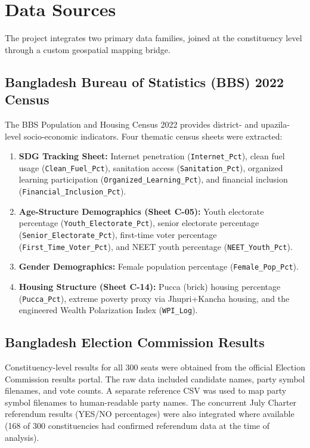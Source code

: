 \documentclass[12pt, a4paper]{article}
\begin{document}
\section{Data Sources}

The project integrates two primary data families, joined at the constituency level through a custom geospatial mapping bridge.

\subsection{Bangladesh Bureau of Statistics (BBS) 2022 Census}
The BBS Population and Housing Census 2022 provides district- and upazila-level socio-economic indicators. Four thematic census sheets were extracted:

\begin{enumerate}
    \item \textbf{SDG Tracking Sheet:} Internet penetration (\texttt{Internet\_Pct}), clean fuel usage (\texttt{Clean\_Fuel\_Pct}), sanitation access (\texttt{Sanitation\_Pct}), organized learning participation (\texttt{Organized\_Learning\_Pct}), and financial inclusion (\texttt{Financial\_Inclusion\_Pct}).
    \item \textbf{Age-Structure Demographics (Sheet C-05):} Youth electorate percentage (\texttt{Youth\_Electorate\_Pct}), senior electorate percentage (\texttt{Senior\_Electorate\_Pct}), first-time voter percentage (\texttt{First\_Time\_Voter\_Pct}), and NEET youth percentage (\texttt{NEET\_Youth\_Pct}).
    \item \textbf{Gender Demographics:} Female population percentage (\texttt{Female\_Pop\_Pct}).
    \item \textbf{Housing Structure (Sheet C-14):} Pucca (brick) housing percentage (\texttt{Pucca\_Pct}), extreme poverty proxy via Jhupri+Kancha housing, and the engineered Wealth Polarization Index (\texttt{WPI\_Log}).
\end{enumerate}

\subsection{Bangladesh Election Commission Results}
Constituency-level results for all 300 seats were obtained from the official Election Commission results portal. The raw data included candidate names, party symbol filenames, and vote counts. A separate reference CSV was used to map party symbol filenames to human-readable party names. The concurrent July Charter referendum results (YES/NO percentages) were also integrated where available (168 of 300 constituencies had confirmed referendum data at the time of analysis).
\end{document}
